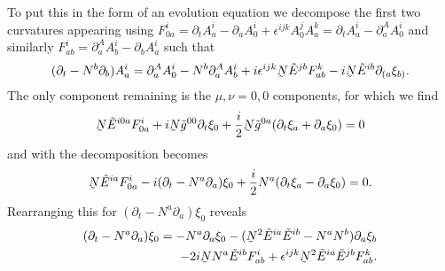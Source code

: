 \documentclass[10pt]{report}
\newcommand{\utilde}[1]{\underaccent{\tilde}{#1}}
\theoremstyle{definition}
\newcommand{\tE}[0]{\tilde{E}}
\newcommand{\tg}[0]{\tilde{g}}
\newcommand{\dlap}[0]{\utilde{N}}
\begin{document}
    To put this in the form of an evolution equation we decompose the first two curvatures appearing using $F^i_{0a} = \partial_t A^i_a - \partial_a A^i_0 + \epsilon^{ijk} A^j_0 A^k_a = \partial_t A^i_a - \partial^A_a A^i_0$ and similarly $F^i_{ab} = \partial^A_a A^i_b - \partial_b A^i_a$ such that 
    \begin{align}
        (\partial_t - N^b \partial_b) A^i_a = \partial^A_a A^i_0 - N^b \partial^A_a A^i_b + i \epsilon^{ijk} \dlap \tE^{jb} F^k_{ab} - i \dlap \tE^{ib} \partial_{(a} \xi_{b)}.
    \end{align}
    The only component remaining is the $\mu,\nu = 0,0$ components, for which we find 
    \begin{align}
        \dlap \tE^{i0a} F^i_{0a} + i \dlap \tg^{00} \partial_t \xi_0 + \frac{i}{2} \dlap \tg^{0a} (\partial_t \xi_a + \partial_a \xi_0) = 0
    \end{align}
    and with the decomposition becomes 
    \begin{align}
        \dlap \tE^{ia} F^i_{0a} - i (\partial_t - N^a \partial_a) \xi_0 + \frac{i}{2} N^a ( \partial_t \xi_a - \partial_a \xi_0) = 0.
    \end{align}
    Rearranging this for $(\partial_t - N^a \partial_a) \xi_0$ reveals
    \begin{align}
        (\partial_t - N^a \partial_a)\xi_0 = - N^a \partial_a \xi_0 - (\dlap^2 \tE^{ia} \tE^{ib} - N^a N^b) \partial_a \xi_b \nonumber \\ -2i \dlap N^a \tE^{ib} F^i_{ab} + \epsilon^{ijk} \dlap^2 \tE^{ia} \tE^{jb} F^k_{ab}.
    \end{align}
\end{document}
